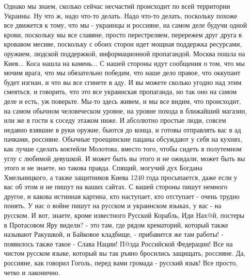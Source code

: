 Однако мы знаем, сколько сейчас несчастий происходит по всей территории
Украины. Ну что ж, надо что-то делать. Надо что-то делать, поскольку похоже все
движется к тому, что мы - украинцы и россияне, на самом деле будучи одной
крови, поскольку мы все славяне, просто перестреляем, перережем друг друга в
кровавом месиве, поскольку с обоих сторон идет мощная поддержка ресурсами,
оружием, людской поддержкой, информационной пропагандой. Москва пошла на
Киев... Коса нашла на камень... С нашей стороны идут сообщения о том, что мы
мочим врага, что мы обязательно победим, что наше дело правое, что оккупант
будет изгнан, и что вы все сгинете в аду. И вы можете сколько угодно над этим
смеяться, и говорить, что это все украинская пропаганда, но так оно на самом
деле и есть, уж поверьте.  Мы-то здесь живем, и мы все видим, что происходит,
на самом обычном человеческом уровне, на уровне похода в ближайший магазин, или
же в гости к соседу этажом ниже. И абсолютно простые люди, совсем недавно
взявшие в руки оружие, бьются до конца, и готовы отправлять вас в ад пачками,
россияне.  Обычные троещинские пацаны обсуждают у себя на кухнях, как лучше
сделать коктейли Молотова, вместо того, чтобы сидеть в полутемном углу с
любимой девушкой. И может быть вы этого и не ожидали, может быть вы этого и не
знаете, но такова правда.  Спящий, могучий дух Богдана Хмельницкого, а также
защитников Киева 1240 года просыпается, даже если у вас об этом и не пишут на
ваших сайтах. С вашей стороны пишут немного другое, и какова истинная картина,
кто наступает, кто отступает - очень трудно понять.  У нас о войне пишут на
русском и украинском языках, у вас - на русском. И вот, знаете, кроме
известного Русский Корабль, Иди Нах@й, постеры в Протасовом Яру видели? - это
там, где рядом крематорий, который также называют Ракушкой, и Байковое
кладбище, - прибавится же там работы! - появилось также такое - Слава Нации!
П@зда Российской Федерации! Все на чистом русском языке, который вы так ръяно
бросились защищать, россияне. Да, россияне, как говорил Гоголь, перед вами
громада - русский язык!  Все просто, четко и лаконично.

